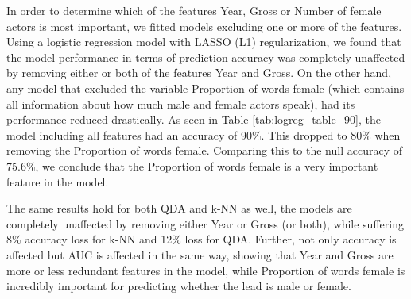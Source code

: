 \documentclass[../../project.tex]{subfiles}
\begin{document}
	In order to determine which of the features Year, Gross or Number of female actors is most important, we fitted models excluding one or more of the features. Using a logistic regression model with LASSO (L1) regularization, we found that the model performance in terms of prediction accuracy was completely unaffected by removing either or both of the features Year and Gross. On the other hand, any model that excluded the variable Proportion of words female (which contains all information about how much male and female actors speak), had its performance reduced drastically. As seen in Table \ref{tab:logreg_table_90}, the model including all features had an accuracy of 90\%. This dropped to 80\% when removing the Proportion of words female. Comparing this to the null accuracy of 75.6\%, we conclude that the Proportion of words female is a very important feature in the model.
	
	The same results hold for both QDA and k-NN as well, the models are completely unaffected by removing either Year or Gross (or both), while suffering 8\% accuracy loss for k-NN and 12\% loss for QDA. Further, not only accuracy is affected but AUC is affected in the same way, showing that Year and Gross are more or less redundant features in the model, while Proportion of words female is incredibly important for predicting whether the lead is male or female.
\end{document}
